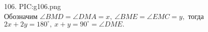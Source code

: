 106. {{PIC:g106.png}}\\
Обозначим $\angle BMD=\angle DMA=x,\ \angle BME=\angle EMC=y,$ тогда $2x+2y=180^\circ,\ x+y=90^\circ=\angle DME.$\\
